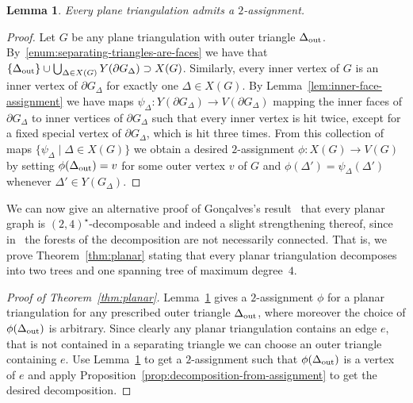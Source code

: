 \documentclass[a4paper,10pt]{article}
\theoremstyle{plain}
\newtheorem{lem}[thm]{Lemma}
\renewcommand{\outer}[1]{\partial{#1}}
\begin{document}
\begin{lem}\label{lem:2-assignment}
 Every plane triangulation admits a $2$-assignment.
\end{lem}
% 
\begin{proof}
 Let $G$ be any plane triangulation with outer triangle $\Delta_{\rm out}$.
 By~\ref{enum:separating-triangles-are-faces} we have that $\{\Delta_{\rm out}\} \cup \bigcup_{\Delta \in X(G)} Y(\outer{G_\Delta}) \supset X(G)$.
 Similarly, every inner vertex of $G$ is an inner vertex of $\outer{G_\Delta}$ for exactly one $\Delta \in X(G)$.
 By Lemma~\ref{lem:inner-face-assignment} we have maps $\psi_\Delta : Y(\outer{G_\Delta}) \to V(\outer{G_\Delta})$ mapping the inner faces of $\outer{G_\Delta}$ to inner vertices of $\outer{G_\Delta}$ such that every inner vertex is hit twice, except for a fixed special vertex of $\outer{G_\Delta}$, which is hit three times.
 From this collection of maps $\{\psi_\Delta \mid \Delta \in X(G)\}$ we obtain a desired $2$-assignment $\phi : X(G) \to V(G)$ by setting $\phi(\Delta_{\rm out}) = v$ for some outer vertex $v$ of $G$ and $\phi(\Delta') = \psi_\Delta(\Delta')$ whenever $\Delta' \in Y(G_\Delta)$.
\end{proof}



We can now give an alternative proof of Gon{\c{c}}alves's result~\cite{Gon-09} that every planar graph is $(2,4)^\star$-decomposable and indeed a slight strengthening thereof, since in~\cite{Gon-09} the forests of the decomposition are not necessarily connected.
That is, we prove Theorem~\ref{thm:planar} stating that every planar triangulation decomposes into two trees and one spanning tree of maximum degree~$4$.

\begin{proof}[Proof of Theorem~\ref{thm:planar}]
 Lemma~\ref{lem:2-assignment} gives a $2$-assignment $\phi$ for a planar triangulation for any prescribed outer triangle $\Delta_{\rm out}$, where moreover the choice of $\phi(\Delta_{\rm out})$  is arbitrary. Since clearly any planar triangulation contains an edge $e$, that is not contained in a separating triangle we can choose an outer triangle containing $e$. Use Lemma~\ref{lem:2-assignment} to get a $2$-assignment such that $\phi(\Delta_{\rm out})$  is a vertex of $e$ and apply Proposition~\ref{prop:decomposition-from-assignment} to get the desired decomposition.
\end{proof}

\end{document}
